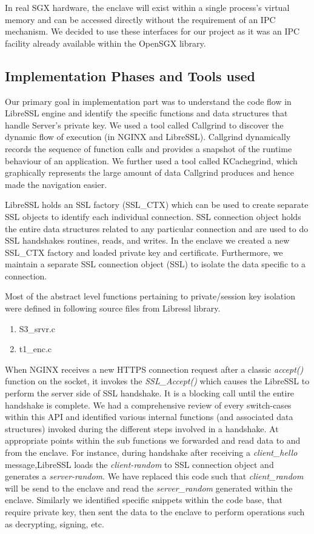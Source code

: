 \documentclass[../main.tex]{subfiles}
\begin{document}
In real SGX hardware, the enclave will exist within a single process's virtual
memory and can be accessed directly without the requirement of an IPC
mechanism. We decided to use these interfaces for our project as it was an IPC
facility already available within the OpenSGX library.

\subsection{Implementation Phases and Tools used}
Our primary goal in implementation part was to understand the code flow in LibreSSL
engine and identify the specific functions and data structures that handle Server’s 
private key. We used a tool called Callgrind to discover the dynamic flow of execution 
(in NGINX and LibreSSL). Callgrind dynamically records the sequence of function calls 
and provides a snapshot of the runtime behaviour of an application. We further used a
tool called KCachegrind, which graphically represents the large amount of data 
Callgrind produces and hence made the navigation easier.
 
LibreSSL holds an SSL factory (SSL\_CTX) which can be used to create separate SSL objects
to identify each individual connection. SSL connection object holds the entire 
data structures related to any particular connection and are used to do SSL handshakes
routines, reads, and writes. In the enclave we created a new SSL\_CTX factory and loaded
private key and certificate. Furthermore, we maintain a separate SSL connection object (SSL)
to isolate the data specific to a connection.   
 
Most of the abstract level functions pertaining to private/session key isolation were defined  
in following source files from Libressl library.
\begin{enumerate}
  \item S3\_srvr.c
  \item t1\_enc.c
\end{enumerate}
 
When NGINX receives a new HTTPS connection request after a classic \textit{accept()} function 
on the socket, it invokes the \textit{SSL\_Accept()} which causes the LibreSSL to perform the 
server side of SSL handshake. It is a blocking call until the entire handshake is complete. 
We had a comprehensive review of every switch-cases within this API and identified various 
internal functions (and associated data structures) invoked during the different steps 
involved in a handshake. At appropriate points within the sub functions we forwarded and read 
data to and from the enclave. For instance, during handshake after receiving a \textit{client\_hello}
message,LibreSSL loads the \textit{client-random} to SSL connection object and generates a \textit{server-random}. 
We have replaced this code such that \textit{client\_random} will be send to the enclave and read
the \textit{server\_random} generated within the enclave. Similarly we identified specific snippets within
the code base, that require private key, then sent the data to the enclave to perform operations such as 
decrypting, signing, etc. 
\end{document}
